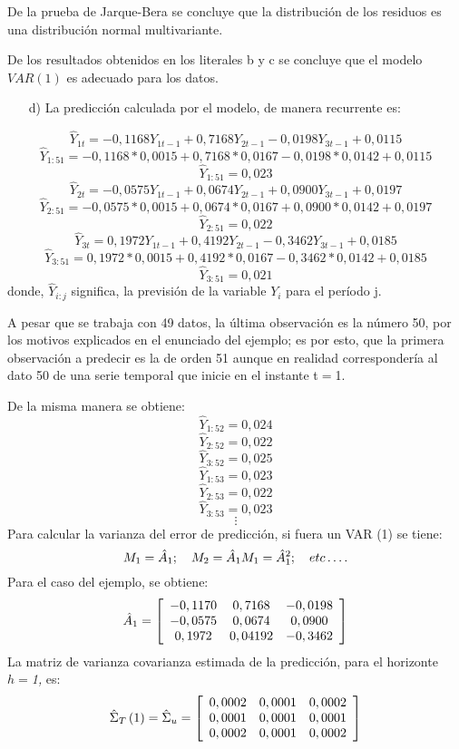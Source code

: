 De la prueba de Jarque-Bera se concluye que la distribuci\'{o}n de los residuos es una distribuci\'{o}n normal multivariante.

\begin{observacion}
De los resultados obtenidos en los literales b y c se concluye que el modelo $VAR(1)$ es adecuado para los datos. 
\end{observacion}

\begin{enumerate}
      \item[d)] La predicci\'{o}n calculada por el modelo, de manera recurrente es:
\end{enumerate}
\[
\hat{Y}_{1t}=-0,1168Y_{1t-1}+0,7168Y_{2t-1}-0,0198Y_{3t-1}+0,0115
\]
\[
\hat{Y}_{1:51}=-0,1168\ast 0,0015+0,7168\ast 0,0167-0,0198\ast 0,0142+0,0115
\]
\[
\hat{Y}_{1:51}=0,023
\]
\[
\hat{Y}_{2t}=-0,0575Y_{1t-1}+0,0674Y_{2t-1}+0,0900Y_{3t-1}+0,0197
\]
\[
\hat{Y}_{2:51}=-0,0575\ast 0,0015+0,0674\ast 0,0167+0,0900\ast 0,0142+0,0197
\]
\[
\hat{Y}_{2:51}=0,022
\]
\[
\hat{Y}_{3t}=0,1972Y_{1t-1}+0,4192Y_{2t-1}-0,3462Y_{3t-1}+0,0185
\]
\[
\hat{Y}_{3:51}=0,1972\ast 0,0015+0,4192\ast 0,0167-0,3462\ast 0,0142+0,0185
\]
\[
\hat{Y}_{3:51}=0,021
\]
donde, $\hat{Y}_{i:j}$ significa, la previsi\'{o}n de la variable $Y_{i}$ para el per\'{i}odo j.

\begin{observacion}
A pesar que se trabaja con 49 datos, la \'{u}ltima observaci\'{o}n es la n\'{u}mero 50, por los motivos explicados en el enunciado del ejemplo; es por esto, que la primera observaci\'{o}n a predecir es la de orden 51 aunque en realidad corresponder\'{i}a al dato 50 de una serie temporal que inicie en el instante t$=$1.
\end{observacion}

De la misma manera se obtiene:
\[
\hat{Y}_{1:52}=0,024
\]
\[
\hat{Y}_{2:52}=0,022
\]
\[
\hat{Y}_{3:52}=0,025
\]
\[
\hat{Y}_{1:53}=0,023
\]
\[
\hat{Y}_{2:53}=0,022
\]
\[
\hat{Y}_{3:53}=0,023
\]
\[
\vdots 
\]
Para calcular la varianza del error de predicci\'{o}n, si fuera un VAR (1) se tiene:
\[
M_{1}=\hat{A}_{1};\quad M_{2}=\hat{A}_{1}M_{1}=\hat{A}_{1}^{2};\quad etc\mathellipsis.
\]
Para el caso del ejemplo, se obtiene:
\[
\hat{A}_{1}=\left[ {\begin{array}{*{20}c}
-0,1170 & 0,7168 & -0,0198\\
-0,0575 & 0,0674 & 0,0900\\
0,1972 & 0,04192 & -0,3462\\
\end{array} } \right]
\]
La matriz de varianza covarianza estimada de la predicci\'{o}n, para el horizonte $h=$\textit{1,} es: 
\[
\hat{\Sigma }_{T}\left( 1 \right)=\hat{\Sigma }_{u}=\left[ 
{\begin{array}{*{20}c}
0,0002 & 0,0001 & 0,0002\\
0,0001 & 0,0001 & 0,0001\\
0,0002 & 0,0001 & 0,0002\\
\end{array} } \right]
\]

